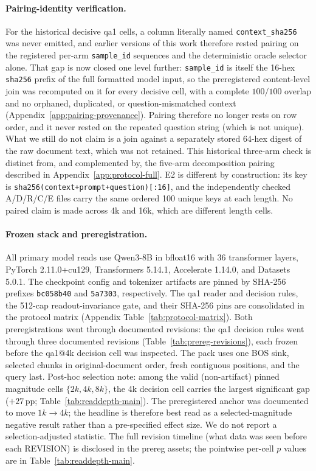 \paragraph{Pairing-identity verification.}
For the historical decisive qa1 cells, a column literally named
\texttt{context\_sha256} was never emitted, and earlier versions of this work
therefore rested pairing on the registered per-arm \texttt{sample\_id}
sequences and the deterministic oracle selector alone.  That gap is now closed
one level further: \texttt{sample\_id} is itself the 16-hex \texttt{sha256}
prefix of the full formatted model input, so the preregistered content-level
join was recomputed on it for every decisive cell, with a complete $100/100$
overlap and no orphaned, duplicated, or question-mismatched context
(Appendix~\ref{app:pairing-provenance}).  Pairing therefore no longer rests on
row order, and it never rested on the repeated question string (which is not
unique).  What we still do not claim is a join against a separately stored
64-hex digest of the raw document text, which was not retained.  This historical
three-arm check is distinct from, and complemented by, the five-arm
decomposition pairing described in Appendix~\ref{app:protocol-full}.  E2 is
different by construction: its key is
\texttt{sha256(context+prompt+question)[:16]}, and the independently checked
A/D/R/C/E files carry the same ordered 100 unique keys at each length.  No
paired claim is made across 4k and 16k, which are different length cells.

\FloatBarrier

\paragraph{Frozen stack and preregistration.}
All primary model reads use Qwen3-8B in bfloat16 with 36 transformer layers,
PyTorch 2.11.0+cu129, Transformers 5.14.1, Accelerate 1.14.0, and Datasets
5.0.1.  The checkpoint config and tokenizer artifacts are pinned by SHA-256
prefixes \texttt{bc058b40} and \texttt{5a7303}, respectively.  The qa1 reader
and \mbox{decision} rules, the 512-cap readout-invariance gate, and their
SHA-256 pins are consolidated in the protocol matrix (Appendix
Table~\ref{tab:protocol-matrix}).  Both preregistrations went through
documented revisions: the qa1 \mbox{decision} rules went through three
documented revisions (Table~\ref{tab:prereg-revisions}), each frozen before
the qa1@4k \mbox{decision} cell was inspected.
The pack uses one BOS sink, selected chunks in original-document order, fresh
contiguous positions, and the query last.  Post-hoc selection note: among the
valid (non-artifact) pinned magnitude cells $\{2k,4k,8k\}$, the 4k \mbox{decision}
cell carries the largest significant gap ($+27$\,pp; Table~\ref{tab:readdepth-main}).
The preregistered anchor was documented to move $1k\!\to\!4k$; the headline is
therefore best read as a selected-magnitude negative result rather than a
pre-specified effect size.  We do not report a selection-adjusted statistic.
The full revision timeline (what data was seen before each REVISION) is
disclosed in the prereg assets; the pointwise per-cell $p$ values are in
Table~\ref{tab:readdepth-main}.

